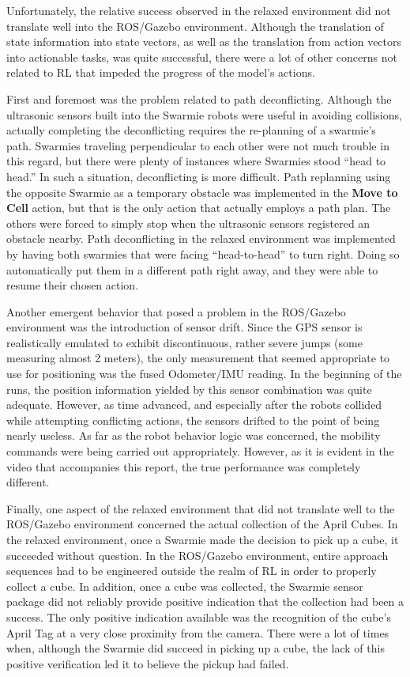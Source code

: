 \documentclass[sigconf,authordraft]{acmart}
\begin{document}
Unfortunately, the relative success observed in the relaxed environment did not translate well into the ROS/Gazebo environment. Although the translation of state information into state vectors, as well as the translation from action vectors into actionable tasks, was quite successful, there were a lot of other concerns not related to RL that impeded the progress of the model's actions.

First and foremost was the problem related to path deconflicting. Although the ultrasonic sensors built into the Swarmie robots were useful in avoiding collisions, actually completing the deconflicting requires the re-planning of a swarmie's path. Swarmies traveling perpendicular to each other were not much trouble in this regard, but there were plenty of instances where Swarmies stood ``head to head.'' In such a situation, deconflicting is more difficult. Path replanning using the opposite Swarmie as a temporary obstacle was implemented in the \textbf{Move to Cell} action, but that is the only action that actually employs a path plan. The others were forced to simply stop when the ultrasonic sensors registered an obstacle nearby. Path deconflicting in the relaxed environment was implemented by having both swarmies that were facing ``head-to-head'' to turn right. Doing so automatically put them in a different path right away, and they were able to resume their chosen action.

Another emergent behavior that posed a problem in the ROS/Gazebo environment was the introduction of sensor drift. Since the GPS sensor is realistically emulated to exhibit discontinuous, rather severe jumps (some measuring almost 2 meters), the only measurement that seemed appropriate to use for positioning was the fused Odometer/IMU reading. In the beginning of the runs, the position information yielded by this sensor combination was quite adequate. However, as time advanced, and especially after the robots collided while attempting conflicting actions, the sensors drifted to the point of being nearly useless. As far as the robot behavior logic was concerned, the mobility commands were being carried out appropriately. However, as it is evident in the video that accompanies this report, the true performance was completely different.

Finally, one aspect of the relaxed environment that did not translate well to the ROS/Gazebo environment concerned the actual collection of the April Cubes. In the relaxed environment, once a Swarmie made the decision to pick up a cube, it succeeded without question. In the ROS/Gazebo environment, entire approach sequences had to be engineered outside the realm of RL in order to properly collect a cube. In addition, once a cube was collected, the Swarmie sensor package did not reliably provide positive indication that the collection had been a success. The only positive indication available was the recognition of the cube's April Tag at a very close proximity from the camera. There were a lot of times when, although the Swarmie did succeed in picking up a cube, the lack of this positive verification led it to believe the pickup had failed.
\end{document}
